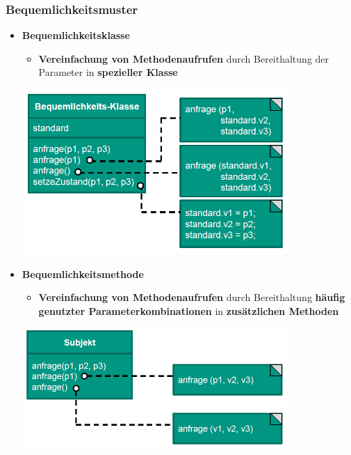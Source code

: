 		\subsubsection{Bequemlichkeitsmuster}
				
			\begin{itemize}
				\item \textbf{Bequemlichkeitsklasse}
				\begin{itemize}
					\item \textbf{Vereinfachung von Methodenaufrufen} durch Bereithaltung der Parameter in \textbf{spezieller Klasse}
				\end{itemize}
				\begin{center}
					\includegraphics[width=0.8\textwidth]{../resources/images/bequemlichkeitsklasse.png}
				\end{center}
				\item \textbf{Bequemlichkeitsmethode}
				\begin{itemize}
					\item \textbf{Vereinfachung von Methodenaufrufen} durch Bereithaltung \textbf{häufig genutzter Parameterkombinationen} in \textbf{zusätzlichen Methoden}
				\end{itemize}
				\begin{center}
					\includegraphics[width=0.8\textwidth]{../resources/images/bequemlichkeitsmethode.png}
				\end{center}

\end{itemize}
